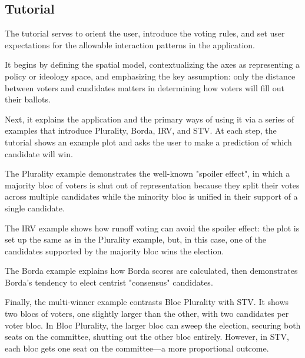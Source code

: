 
\subsection{Tutorial}%
\label{sub:Tutorial}
The tutorial serves to orient the user, introduce the voting rules,
and set user expectations for the allowable interaction patterns in the application.

It begins by defining the spatial model, contextualizing the axes
as representing a policy or ideology space, and emphasizing the
key assumption: only the distance between voters and candidates matters
in determining how voters will fill out their ballots.

Next, it explains the application and the primary ways of using it
via a series of examples that introduce Plurality, Borda, IRV, and STV.
At each step, the tutorial shows an example plot
and asks the user to make a prediction of which candidate will win.

The Plurality example demonstrates the well-known "spoiler effect",
in which a majority bloc of voters is shut out of representation
because they split their votes across multiple candidates
while the minority bloc is unified in their support of a single candidate.

The IRV example shows how runoff voting can avoid the spoiler effect:
the plot is set up the same as in the Plurality example,
but, in this case, one of the candidates supported by the majority bloc wins the election.

The Borda example explains how Borda scores are calculated,
then demonstrates Borda's tendency to elect centrist "consensus" candidates.

Finally, the multi-winner example contrasts Bloc Plurality with STV.
It shows two blocs of voters, one slightly larger than the other,
with two candidates per voter bloc.
In Bloc Plurality, the larger bloc can sweep the election,
securing both seats on the committee, shutting out the other bloc entirely.
However, in STV, each bloc gets one seat on the committee---a more proportional outcome.


